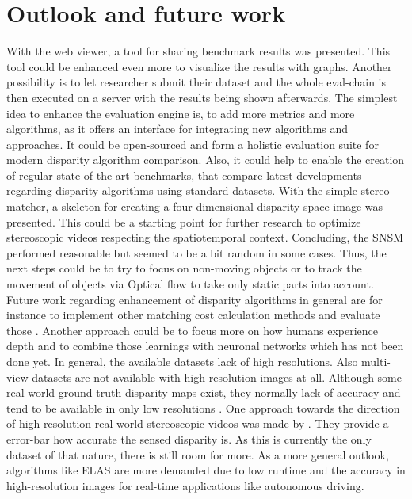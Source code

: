 \section{Outlook and future work}

With the web viewer, a tool for sharing benchmark results was presented.
This tool could be enhanced even more to visualize the results with graphs.
Another possibility is to let researcher submit their dataset and the whole eval-chain is then executed on a server with the results being shown afterwards.
The simplest idea to enhance the evaluation engine is, to add more metrics and more algorithms, as it offers an interface for integrating new algorithms and approaches.
It could be open-sourced and form a holistic evaluation suite for modern disparity algorithm comparison.
Also, it could help to enable the creation of regular state of the art benchmarks, that compare latest developments regarding disparity algorithms using standard datasets.
\newline\newline\noindent With the simple stereo matcher, a skeleton for creating a four-dimensional disparity space image was presented.
This could be a starting point for further research to optimize stereoscopic videos respecting the spatiotemporal context.
Concluding, the SNSM performed reasonable but seemed to be a bit random in some cases.
Thus, the next steps could be to try to focus on non-moving objects or to track the movement of objects via Optical flow to take only static parts into account.
\newline\newline\noindent Future work regarding enhancement of disparity algorithms in general are for instance to implement other matching cost calculation methods and evaluate those \citep{hermann2010gradient}.
Another approach could be to focus more on how humans experience depth \citep{deangelis1995neuronal} and to combine those learnings with neuronal networks \citep{olshausen1996emergence} which has not been done yet.
\newline\newline\noindent In general, the available datasets lack of high resolutions.
Also multi-view datasets are not available with high-resolution images at all.
Although some real-world ground-truth disparity maps exist, they normally lack of accuracy and tend to be available in only low resolutions \citep{Geiger2011IV}.
One approach towards the direction of high resolution real-world stereoscopic videos was made by \citeauthor{kondermann2015stereo} \citep{kondermann2015stereo}.
They provide a error-bar how accurate the sensed disparity is.
As this is currently the only dataset of that nature, there is still room for more.
\newline\newline\noindent As a more general outlook, algorithms like ELAS \citep{Geiger2010ACCV} are more demanded due to low runtime and the accuracy in high-resolution images for real-time applications like autonomous driving.
